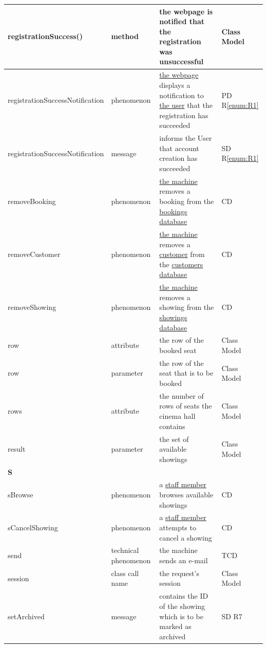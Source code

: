 \documentclass[a4paper,10pt,titlepage,bibtotoc,bibtotocnumbered]{scrreprt}
\begin{document}
\begin{longtable}{|p{4cm}|p{3cm}|p{5cm}|l|}
\hline
registrationSuccess() & method & the webpage is notified that the registration was unsuccessful & Class Model\\
\hline
\hypertarget{glossary:registrationSuccessNotification}{registrationSuccessNotification} & phenomenon & \hyperlink{glossary:WebpageRegisterCustomer}{the webpage} displays a notification to \hyperlink{glossary:User}{the user} that the registration has succeeded & PD R\ref{enum:R1}\\
\hline
registrationSuccessNotification & message & informs the User that account creation has succeeded & SD R\ref{enum:R1}\\
\hline
\hypertarget{glossary:removeBooking}{removeBooking} & phenomenon &  \hyperlink{glossary:UDEKino}{the machine} removes a booking from the \hyperlink{glossary:Booking}{bookings database} & CD\\
\hline
\hypertarget{glossary:removeBooking}{removeCustomer} & phenomenon &  \hyperlink{glossary:UDEKino}{the machine} removes a \hyperlink{glossary:Customer}{customer} from the \hyperlink{glossary:CustomerAccount}{customers database} & CD\\
\hline
\hypertarget{glossary:removeShowing}{removeShowing} & phenomenon &  \hyperlink{glossary:UDEKino}{the machine} removes a showing from the \hyperlink{glossary:Showing}{showings database} & CD\\
\hline
row & attribute & the row of the booked seat & Class Model\\
\hline
row & parameter & the row of the seat that is to be booked & Class Model\\
\hline
rows & attribute & the number of rows of seats the cinema hall contains & Class Model\\
\hline
result & parameter & the set of available showings & Class Model\\
\hline
\multicolumn{4}{|l|}{\textbf{S}}\\
\hline
\hypertarget{glossary:sBrowse}{sBrowse} & phenomenon & a \hyperlink{glossary:StaffMember}{staff member} browses available showings & CD\\
\hline
\hypertarget{glossary:sCancelShowing}{sCancelShowing} & phenomenon & a \hyperlink{glossary:StaffMember}{staff member} attempts to cancel a showing & CD\\
\hline
send & technical phenomenon & the machine sends an e-mail & TCD\\
\hline
session & class call name & the request's session & Class Model\\
\hline
setArchived & message & contains the ID of the showing which is to be marked as archived & SD R7\\

\end{longtable}
\end{document}
